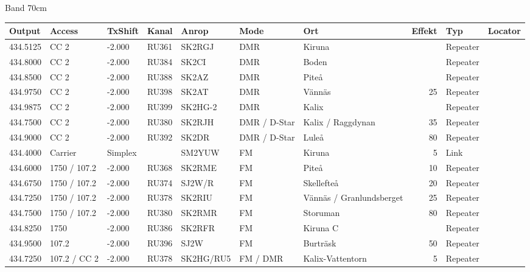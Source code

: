 \large{Band 70cm}
\begin{longtable}{lllllllrlr}
Output & Access & TxShift & Kanal & Anrop & Mode & Ort & Effekt & Typ & Locator \\ \hline
434.5125&CC 2&-2.000&RU361&SK2RGJ&DMR&Kiruna&&Repeater&\\
434.8000&CC 2&-2.000&RU384&SK2CI&DMR&Boden&&Repeater&\\
434.8500&CC 2&-2.000&RU388&SK2AZ&DMR&Piteå&&Repeater&\\
434.9750&CC 2&-2.000&RU398&SK2AT&DMR&Vännäs&25&Repeater&\\
434.9875&CC 2&-2.000&RU399&SK2HG-2&DMR&Kalix&&Repeater&\\
434.7500&CC 2&-2.000&RU380&SK2RJH&DMR / D-Star&Kalix / Raggdynan&35&Repeater&\\
434.9000&CC 2&-2.000&RU392&SK2DR&DMR / D-Star&Luleå&80&Repeater&\\
434.4000&Carrier&Simplex&&SM2YUW&FM&Kiruna&5&Link&\\
434.6000&1750 / 107.2&-2.000&RU368&SK2RME&FM&Piteå&10&Repeater&\\
434.6750&1750 / 107.2&-2.000&RU374&SJ2W/R&FM&Skellefteå&20&Repeater&\\
434.7250&1750 / 107.2&-2.000&RU378&SK2RIU&FM&Vännäs / Granlundsberget&25&Repeater&\\
434.7500&1750 / 107.2&-2.000&RU380&SK2RMR&FM&Storuman&80&Repeater&\\
434.8250&1750&-2.000&RU386&SK2RFR&FM&Kiruna C&&Repeater&\\
434.9500&107.2&-2.000&RU396&SJ2W&FM&Burträsk&50&Repeater&\\
434.7250&107.2 / CC 2&-2.000&RU378&SK2HG/RU5&FM / DMR&Kalix-Vattentorn&5&Repeater&\\
\end{longtable}
\clearpage
